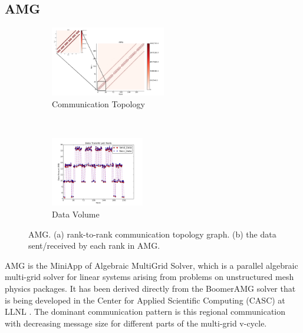 \documentclass[conference]{IEEEtran}
\begin{document}


\subsection{AMG}
\label{sec:amg}

\begin{figure}[t!]
    \centering
    \begin{subfigure}[t]{0.22\textwidth}
        \centering
        \includegraphics[height=1.2in]{figs/appstudy/amg/amg_pip}
        \caption{Communication Topology}
        \label{fig: amg communication topology}
    \end{subfigure}%
    ~
    \begin{subfigure}[t]{0.22\textwidth}
        \centering
        \includegraphics[height=1.2in]{figs/appstudy/amg/amg_data_transfer}
        \caption{Data Volume}
        \label{fig: amg data trans}
    \end{subfigure}
    \caption{AMG. (a) rank-to-rank communication topology graph. (b) the data sent/received by each rank in AMG.}
\end{figure}

AMG is the MiniApp of Algebraic MultiGrid Solver, which is a parallel algebraic multi-grid solver for linear systems arising from problems on unstructured mesh physics packages. It has been derived directly from the BoomerAMG solver that is being developed in the Center for Applied Scientific Computing (CASC) at LLNL \cite{amg}. The dominant communication pattern is this regional communication with decreasing message size for different parts of the multi-grid v-cycle.
\end{document}

